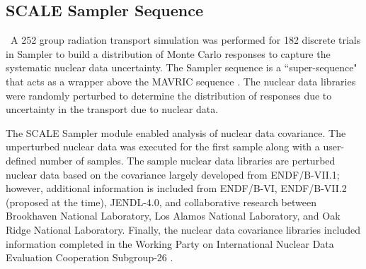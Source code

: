 

\subsection{SCALE Sampler Sequence}\label{'secSCALEMG'}

\ A 252 group radiation transport simulation was performed for 182 discrete trials in Sampler to build a distribution of Monte Carlo responses to capture the systematic nuclear data uncertainty. 
The Sampler sequence is a ``super-sequence" that acts as a wrapper above the MAVRIC sequence \cite{SCALE}. 
The nuclear data libraries were randomly perturbed to determine the distribution of responses due to uncertainty in the transport due to nuclear data.  

The SCALE Sampler module enabled analysis of nuclear data covariance. 
The unperturbed nuclear data was executed for the first sample along with a user-defined number of samples. 
The sample nuclear data libraries are perturbed nuclear data based on the covariance  largely developed from ENDF/B-VII.1; however, additional information is included from ENDF/B-VI, ENDF/B-VII.2 (proposed at the time), JENDL-4.0, and collaborative research between Brookhaven National Laboratory, Los Alamos National Laboratory, and Oak Ridge National Laboratory.
Finally, the nuclear data covariance libraries included information completed in the Working Party on International Nuclear Data Evaluation Cooperation Subgroup-26 \cite{SCALE}.

